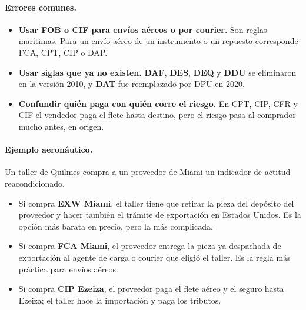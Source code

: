 \paragraph*{Errores comunes.}
\begin{itemize}
  \item \textbf{Usar FOB o CIF para envíos aéreos o por courier.} Son reglas marítimas. Para
        un envío aéreo de un instrumento o un repuesto corresponde FCA, CPT, CIP o DAP.
  \item \textbf{Usar siglas que ya no existen.} \textbf{DAF}, \textbf{DES}, \textbf{DEQ} y
        \textbf{DDU} se eliminaron en la versión 2010, y \textbf{DAT} fue reemplazado por
        DPU en 2020.
  \item \textbf{Confundir quién paga con quién corre el riesgo.} En CPT, CIP, CFR y CIF el
        vendedor paga el flete hasta destino, pero el riesgo pasa al comprador mucho antes,
        en origen.
\end{itemize}

\paragraph*{Ejemplo aeronáutico.}
Un taller de Quilmes compra a un proveedor de Miami un indicador de actitud reacondicionado.
\begin{itemize}
  \item Si compra \textbf{EXW Miami}, el taller tiene que retirar la pieza del depósito del
        proveedor y hacer también el trámite de exportación en Estados Unidos. Es la opción
        más barata en precio, pero la más complicada.
  \item Si compra \textbf{FCA Miami}, el proveedor entrega la pieza ya despachada de
        exportación al agente de carga o courier que eligió el taller. Es la regla más
        práctica para envíos aéreos.
  \item Si compra \textbf{CIP Ezeiza}, el proveedor paga el flete aéreo y el seguro hasta
        Ezeiza; el taller hace la importación y paga los tributos.
\end{itemize}

